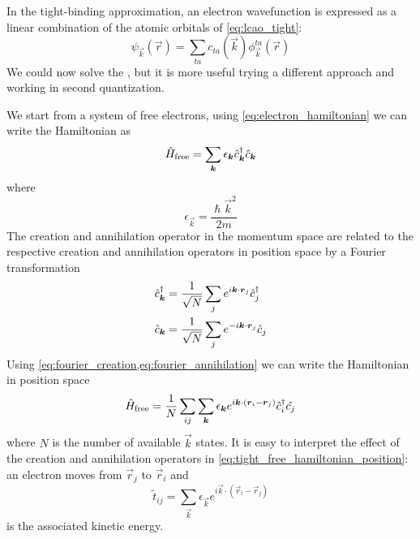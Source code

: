 In the tight-binding approximation, an electron wavefunction is expressed as a linear combination of the atomic orbitals of \cref{eq:lcao_tight}:
\begin{equation} \label{eq:lcao}
    \psi_\vec{k}(\vec{r}) = \sum_{ta} c_{ta}(\vec{k}) \phi_\vec{k}^{ta}(\vec{r})
\end{equation}
We could now solve the \sche, but it is more useful trying a different approach and working in second quantization.

We start from a system of free electrons, using \cref{eq:electron_hamiltonian} we can write the Hamiltonian as
\begin{equation}
    \hat{H}_\text{free} = \sum_{\mathbf{\boldsymbol{k}}} \epsilon_{\mathbf{\boldsymbol{k}}} \hat{c}^\dagger_{\mathbf{\boldsymbol{k}}}\hat{c}_{\mathbf{\boldsymbol{k}}}
\end{equation}
where
\begin{equation} \label{eq:tight_free_disperion}
    \epsilon_{\vec{k}} = \frac{\hslash\vec{k}^2}{2m}
\end{equation}
The creation and annihilation operator in the momentum space are related to the respective creation and annihilation operators in position space by a Fourier transformation
\begin{align} \label{eq:fourier_creation}
    \hat{c}^\dagger_{\mathbf{\boldsymbol{k}}} & = \frac{1}{\sqrt{N}} \sum_j e^{i\mathbf{\boldsymbol{k}}\cdot\mathbf{\boldsymbol{r}}_j} \hat{c}^\dagger_j \\ \label{eq:fourier_annihilation}
    \hat{c}_{\mathbf{\boldsymbol{k}}}  & = \frac{1}{\sqrt{N}} \sum_j e^{-i\mathbf{\boldsymbol{k}}\cdot\mathbf{\boldsymbol{r}}_j} \hat{c}_j
\end{align}
Using \cref{eq:fourier_creation,eq:fourier_annihilation} we can write the Hamiltonian in position space
\begin{equation} \label{eq:tight_free_hamiltonian_position}
    \hat{H}_\text{free} = \frac{1}{N} \sum_{ij} \sum_{\mathbf{\boldsymbol{k}}} \epsilon_{\mathbf{\boldsymbol{k}}} e^{i\mathbf{\boldsymbol{k}}\cdot(\mathbf{\boldsymbol{r}}_i - \mathbf{\boldsymbol{r}}_j)} \hat{c}^\dagger_i\hat{c_j}
\end{equation}
where $N$ is the number of available $\vec{k}$ states. It is easy to interpret the effect of the creation and annihilation operators in \cref{eq:tight_free_hamiltonian_position}: an electron moves from $\vec{r}_j$ to $\vec{r}_i$ and
\begin{equation}
    \tilde{t}_{ij} = \sum_\vec{k} \epsilon_{\vec{k}} e^{i\vec{k}\cdot(\vec{r}_i - \vec{r}_j)}
\end{equation}
is the associated kinetic energy.

